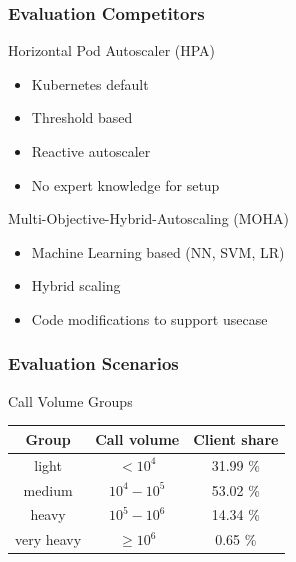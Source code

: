 \documentclass[11pt,t,usepdftitle=false,aspectratio=169]{beamer}
\begin{document}
\begin{frame}
	\frametitle{Evaluation Competitors}
	
	\begin{block}{Horizontal Pod Autoscaler (HPA)}
		\begin{itemize}
			\item Kubernetes default
			\item Threshold based
			\item Reactive autoscaler
			\item No expert knowledge for setup
		\end{itemize}
	\end{block}
	
	\begin{block}{Multi-Objective-Hybrid-Autoscaling (MOHA)}
		\begin{itemize}
			\item Machine Learning based (NN, SVM, LR)
			\item Hybrid scaling
			\item Code modifications to support usecase
		\end{itemize}
	\end{block}
\end{frame}

\begin{frame}
	\frametitle{Evaluation Scenarios}
	
	\begin{alertblock}{Call Volume Groups}
		\begin{table}
			\begin{center}
				\begin{tabular}{|c c c|}
					\hline
					Group & Call volume & Client share \\
					\hline
					light & $< 10^4$ & 31.99 \% \\
					medium & $10^4 - 10^5$ & 53.02 \% \\
					heavy &  $10^5 - 10^6$ & 14.34 \% \\
					very heavy & $\ge 10^6$ & 0.65 \% \\
					\hline
				\end{tabular}
			\end{center}
		\end{table}
	\end{alertblock}
\end{frame}
\end{document}
